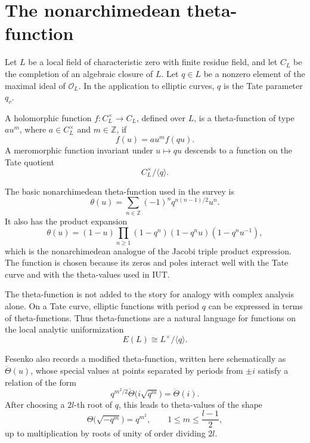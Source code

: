 \section{The nonarchimedean theta-function}

Let \(L\) be a local field of characteristic zero with finite residue field, and let \(C_L\) be the completion of an algebraic closure of \(L\).  Let \(q\in L\) be a nonzero element of the maximal ideal of \(\mathcal O_L\).  In the application to elliptic curves, \(q\) is the Tate parameter \(q_v\).

\begin{definition}
A holomorphic function \(f:C_L^{\times}\to C_L\), defined over \(L\), is a theta-function of type \(a u^m\), where \(a\in C_L^{\times}\) and \(m\in\mathbb Z\), if
\[
  f(u)=a u^m f(qu).
\]
A meromorphic function invariant under \(u\mapsto qu\) descends to a function on the Tate quotient
\[
  C_L^{\times}/\langle q\rangle.
\]
\end{definition}

The basic nonarchimedean theta-function used in the survey is
\[
  \theta(u)=\sum_{n\in\mathbb Z}(-1)^n q^{n(n-1)/2}u^n.
\]
It also has the product expansion
\[
  \theta(u)=(1-u)\prod_{n\geq1}(1-q^n)(1-q^n u)(1-q^n u^{-1}),
\]
which is the nonarchimedean analogue of the Jacobi triple product expression.  The function is chosen because its zeros and poles interact well with the Tate curve and with the theta-values used in IUT.

\begin{remark}
The theta-function is not added to the story for analogy with complex analysis alone.  On a Tate curve, elliptic functions with period \(q\) can be expressed in terms of theta-functions.  Thus theta-functions are a natural language for functions on the local analytic uniformization
\[
  E(L)\cong L^{\times}/\langle q\rangle.
\]
\end{remark}

Fesenko also records a modified theta-function, written here schematically as \(\ddot\Theta(u)\), whose special values at points separated by periods from \(\pm i\) satisfy a relation of the form
\[
  q^{m^2/2}\ddot\Theta\bigl(i\sqrt{q^m}\bigr)=\ddot\Theta(i).
\]
After choosing a \(2l\)-th root of \(q\), this leads to theta-values of the shape
\[
  \Theta\bigl(\sqrt{-q^m}\bigr)=q^{m^2},
  \qquad 1\leq m\leq \frac{l-1}{2},
\]
up to multiplication by roots of unity of order dividing \(2l\).

